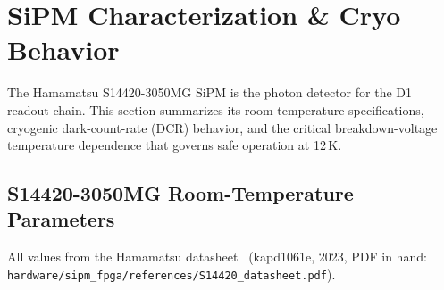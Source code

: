 %

\section{SiPM Characterization \& Cryo Behavior}
\label{sec:sipm-cryo}

The Hamamatsu S14420-3050MG SiPM is the photon detector for the D1 readout chain.
This section summarizes its room-temperature specifications, cryogenic dark-count-rate
(DCR) behavior, and the critical breakdown-voltage temperature dependence that governs
safe operation at 12\,K.

\subsection{S14420-3050MG Room-Temperature Parameters}

All values from the Hamamatsu datasheet~\cite{S14420datasheet} (kapd1061e, 2023, PDF in hand:
\texttt{hardware/sipm\_fpga/references/S14420\_datasheet.pdf}).

